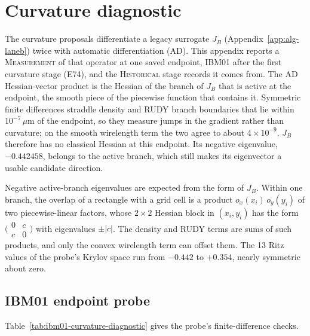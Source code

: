 \section{Curvature diagnostic}\label{app:curvature}

\providecommand{\official}{\textsc{Official}}
\providecommand{\historical}{\textsc{Historical}}
\providecommand{\measurement}{\textsc{Measurement}}
\providecommand{\reproduction}{\textsc{Reproduction}}

The curvature proposals differentiate a legacy surrogate $J_B$
(Appendix~\ref{app:alg-laneb}) twice with automatic differentiation (AD). This
appendix reports a \measurement{} of that operator at one saved endpoint, IBM01 after
the first curvature stage (E74), and the \historical{} stage records it comes from.
The AD Hessian-vector product is the Hessian of the branch of $J_B$ that is active at
the endpoint, the smooth piece of the piecewise function that contains it. Symmetric
finite differences straddle density and RUDY branch boundaries that lie within
$10^{-7}\,\mu$m of the endpoint, so they measure jumps in the gradient rather than
curvature; on the smooth wirelength term the two agree to about $4\times10^{-9}$.
$J_B$ therefore has no classical Hessian at this endpoint. Its negative eigenvalue,
$-0.442458$, belongs to the active branch, which still makes its eigenvector a usable
candidate direction.

Negative active-branch eigenvalues are expected from the form of $J_B$. Within one
branch, the overlap of a rectangle with a grid cell is a product
$o_x(x_i)\,o_y(y_i)$ of two piecewise-linear factors, whose $2\times2$ Hessian block
in $(x_i,y_i)$ has the form $\bigl(\begin{smallmatrix}0&c\\c&0\end{smallmatrix}\bigr)$
with eigenvalues $\pm|c|$. The density and RUDY terms are sums of such products, and
only the convex wirelength term can offset them. The 13 Ritz values of the probe's
Krylov space run from $-0.442$ to $+0.354$, nearly symmetric about zero.

\subsection{IBM01 endpoint probe}\label{app:curvature-probe}

Table~\ref{tab:ibm01-curvature-diagnostic} gives the probe's finite-difference checks.


